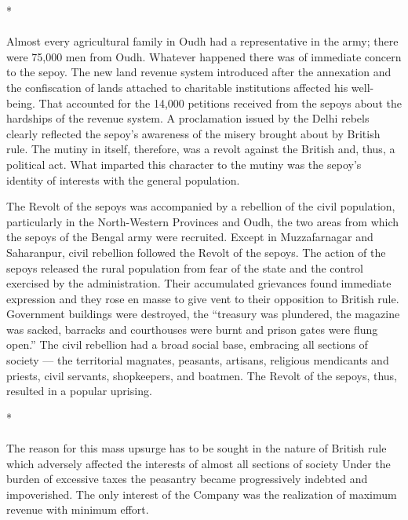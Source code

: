 \begin{center}*\end{center}

\paragraph*{}
Almost every agricultural family in Oudh had a representative in the army; there were 75,000 men from Oudh. Whatever happened there was of immediate concern to the sepoy. The new land revenue system introduced after the annexation and the confiscation of lands attached to charitable institutions affected his well-being. That accounted for the 14,000 petitions received from the sepoys about the hardships of the revenue system. A proclamation issued by the Delhi rebels clearly reflected the sepoy's awareness of the misery brought about by British rule. The mutiny in itself, therefore, was a revolt against the British and, thus, a political act. What imparted this character to the mutiny was the sepoy's identity of interests with the general population.

The Revolt of the sepoys was accompanied by a rebellion of the civil population, particularly in the North-Western Provinces and Oudh, the two areas from which the sepoys of the Bengal army were recruited. Except in Muzzafarnagar and Saharanpur, civil rebellion followed the Revolt of the sepoys. The action of the sepoys released the rural population from fear of the state and the control exercised by the administration. Their accumulated grievances found immediate expression and they rose en masse to give vent to their opposition to British rule. Government buildings were destroyed, the ``treasury was plundered, the magazine was sacked, barracks and courthouses were burnt and prison gates were flung open.'' The civil rebellion had a broad social base, embracing all sections of society — the territorial magnates, peasants, artisans, religious mendicants and priests, civil servants, shopkeepers, and boatmen. The Revolt of the sepoys, thus, resulted in a popular uprising.

\begin{center}*\end{center}

\paragraph*{}
The reason for this mass upsurge has to be sought in the nature of British rule which adversely affected the interests of almost all sections of society Under the burden of excessive taxes the peasantry became progressively indebted and impoverished. The only interest of the Company was the realization of maximum revenue with minimum effort.

